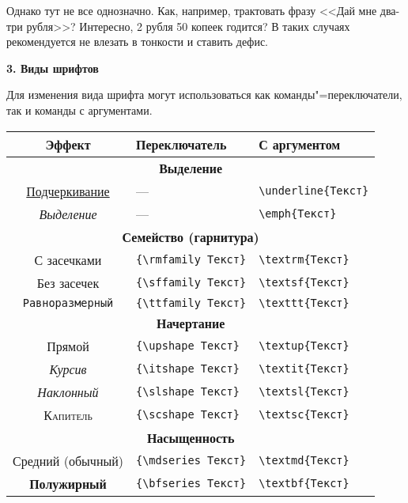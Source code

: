 \documentclass{article}
\begin{document}
Однако тут не все однозначно. Как, например, трактовать фразу <<Дай мне два-три рубля>>? Интересно, 2 рубля 50 копеек годится? В таких случаях рекомендуется не влезать в тонкости и ставить дефис.

\newpage

\textbf{3. Виды шрифтов}

Для изменения вида шрифта могут использоваться как команды"=переключатели, так и команды с аргументами.

\begin{center}
\noindent\begin{tabular}{|c||l|l|}
\hline
\bfseries Эффект          & \bfseries Переключатель  &  \textbf{С аргументом}\\ \hline \multicolumn{3}{|c|}{\bf Выделение}                                                        \\ \hline
\underline{Подчеркивание} & ---                      & \verb"\underline{Текст}"      \\
\emph{Выделение}          & ---                      & \verb"\emph{Текст}"           \\ \hline
\multicolumn{3}{|c|}{\bf Семейство (гарнитура)}                                      \\ \hline
\textrm{С засечками}      & \verb"{\rmfamily Текст}" & \verb"\textrm{Текст}"         \\
\textsf{Без засечек}      & \verb"{\sffamily Текст}" & \verb"\textsf{Текст}"         \\
\texttt{Равноразмерный}   & \verb"{\ttfamily Текст}" & \verb"\texttt{Текст}"         \\ \hline
\multicolumn{3}{|c|}{\bf Начертание}                                                 \\ \hline
\textup{Прямой}           & \verb"{\upshape Текст}"  & \verb"\textup{Текст}"         \\
\textit{Курсив}           & \verb"{\itshape Текст}"  & \verb"\textit{Текст}"         \\
\textsl{Наклонный}        & \verb"{\slshape Текст}"  & \verb"\textsl{Текст}"         \\
\textsc{Капитель}         & \verb"{\scshape Текст}"  & \verb"\textsc{Текст}"         \\ \hline
\multicolumn{3}{|c|}{\bf Насыщенность}                                               \\ \hline
\textmd{Средний (обычный)}& \verb"{\mdseries Текст}" & \verb"\textmd{Текст}"         \\
\textbf{Полужирный}       & \verb"{\bfseries Текст}" & \verb"\textbf{Текст}"         \\ \hline
\end{tabular}
\end{center}
\end{document}
